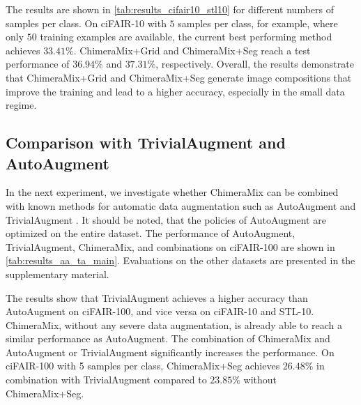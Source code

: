 \documentclass{article}
\newcommand{\methodname}{ChimeraMix\xspace}
\newcommand{\methodnamegrid}{ChimeraMix+Grid\xspace}
\newcommand{\methodnameseg}{ChimeraMix+Seg\xspace}
\newcommand{\cifairX}{ciFAIR-10\xspace}
\newcommand{\cifairC}{ciFAIR-100\xspace}
\newcommand{\stl}{STL-10\xspace}
\begin{document}
The results are shown in \cref{tab:results_cifair10_stl10} for different numbers of samples per class.
On \cifairX with $5$ samples per class, for example, where only $50$ training examples are available, the current best performing method achieves $33.41\%$. 
\methodnamegrid and \methodnameseg reach a test performance of $36.94\%$ and $37.31\%$, respectively.
Overall, the results demonstrate that \methodnamegrid and \methodnameseg generate image compositions that improve the training and lead to a higher accuracy, especially in the small data regime.

\subsection{Comparison with TrivialAugment and AutoAugment}

In the next experiment, we investigate whether \methodname can be combined with known methods for automatic data augmentation such as AutoAugment \cite{cubukAutoAugmentLearningAugmentation2019} and TrivialAugment \cite{mullerTrivialAugmentTuningfreeStateoftheArt2021}.
It should be noted, that the policies of AutoAugment are optimized on the entire dataset.
The performance of AutoAugment, TrivialAugment, \methodname, and combinations on \cifairC are shown in \cref{tab:results_aa_ta_main}. 
Evaluations on the other datasets are presented in the supplementary material. 

The results show that TrivialAugment achieves a higher accuracy than AutoAugment on \cifairC, and vice versa on \cifairX and \stl.
\methodname, without any severe data augmentation, is already able to reach a similar performance as AutoAugment.
The combination of \methodname and AutoAugment or TrivialAugment significantly increases the performance. 
On \cifairC with 5 samples per class, \methodnameseg achieves $26.48\%$ in combination with TrivialAugment compared to $23.85\%$ without \methodnameseg.
\end{document}

